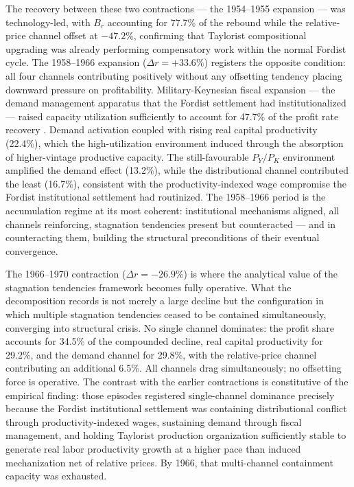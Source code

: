 \documentclass[11pt,a4paper]{article}
\begin{document}
{The recovery between these two contractions --- the 1954--1955 expansion
--- was technology-led, with $B_r$ accounting for 77.7\% of the rebound
while the relative-price channel offset at $-47.2\%$, confirming that
Taylorist compositional upgrading was already performing compensatory work
within the normal Fordist cycle. The 1958--1966 expansion
($\Delta r = +33.6\%$) registers the opposite condition: all four channels
contributing positively without any offsetting tendency placing downward
pressure on profitability. Military-Keynesian fiscal expansion --- the
demand management apparatus that the Fordist settlement had institutionalized
--- raised capacity utilization sufficiently to account for 47.7\% of the
profit rate recovery \citep{Baker1996}. Demand activation coupled with
rising real capital productivity (22.4\%), which the high-utilization
environment induced through the absorption of higher-vintage productive
capacity. The still-favourable $P_Y/P_K$ environment amplified the demand
effect (13.2\%), while the distributional channel contributed the least
(16.7\%), consistent with the productivity-indexed wage compromise the
Fordist institutional settlement had routinized. The 1958--1966 period is
the accumulation regime at its most coherent: institutional mechanisms
aligned, all channels reinforcing, stagnation tendencies present but
counteracted --- and in counteracting them, building the structural
preconditions of their eventual convergence.

The 1966--1970 contraction ($\Delta r = -26.9\%$) is where the analytical
value of the stagnation tendencies framework becomes fully operative.
What the decomposition records is not merely a large decline but the
configuration in which multiple stagnation tendencies ceased to be
contained simultaneously, converging into structural crisis. No single
channel dominates: the profit share accounts for 34.5\% of the compounded
decline, real capital productivity for 29.2\%, and the demand channel
for 29.8\%, with the relative-price channel contributing an additional
6.5\%. All channels drag simultaneously; no offsetting force is operative.
The contrast with the earlier contractions is constitutive of the
empirical finding: those episodes registered single-channel dominance
precisely because the Fordist institutional settlement was containing
distributional conflict through productivity-indexed wages, sustaining
demand through fiscal management, and holding Taylorist production
organization sufficiently stable to generate real labor productivity growth
at a higher pace than induced mechanization net of relative prices. By
1966, that multi-channel containment capacity was exhausted.

}
\end{document}
